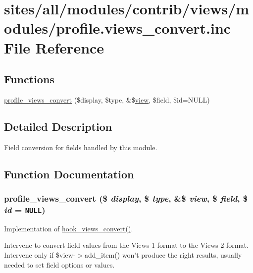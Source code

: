 \hypertarget{profile_8views__convert_8inc}{
\section{sites/all/modules/contrib/views/modules/profile.views\_\-convert.inc File Reference}
\label{profile_8views__convert_8inc}
}
\subsection*{Functions}
\begin{CompactItemize}
\item 
\hyperlink{profile_8views__convert_8inc_4442ca5e5a2ac639a1384d8ce3dd83dc}{profile\_\-views\_\-convert} (\$display, \$type, \&\$\hyperlink{classview}{view}, \$field, \$id=NULL)
\end{CompactItemize}


\subsection{Detailed Description}
Field conversion for fields handled by this module. 

\subsection{Function Documentation}
\hypertarget{profile_8views__convert_8inc_4442ca5e5a2ac639a1384d8ce3dd83dc}{
\subsubsection[{profile\_\-views\_\-convert}]{\setlength{\rightskip}{0pt plus 5cm}profile\_\-views\_\-convert (\$ {\em display}, \/  \$ {\em type}, \/  \&\$ {\em view}, \/  \$ {\em field}, \/  \$ {\em id} = {\tt NULL})}}
\label{profile_8views__convert_8inc_4442ca5e5a2ac639a1384d8ce3dd83dc}


Implementation of \hyperlink{group__views__hooks_ge98b0a1c700fe1406af390dfc8c7262e}{hook\_\-views\_\-convert()}.

Intervene to convert field values from the Views 1 format to the Views 2 format. Intervene only if \$view-$>$add\_\-item() won't produce the right results, usually needed to set field options or values. 